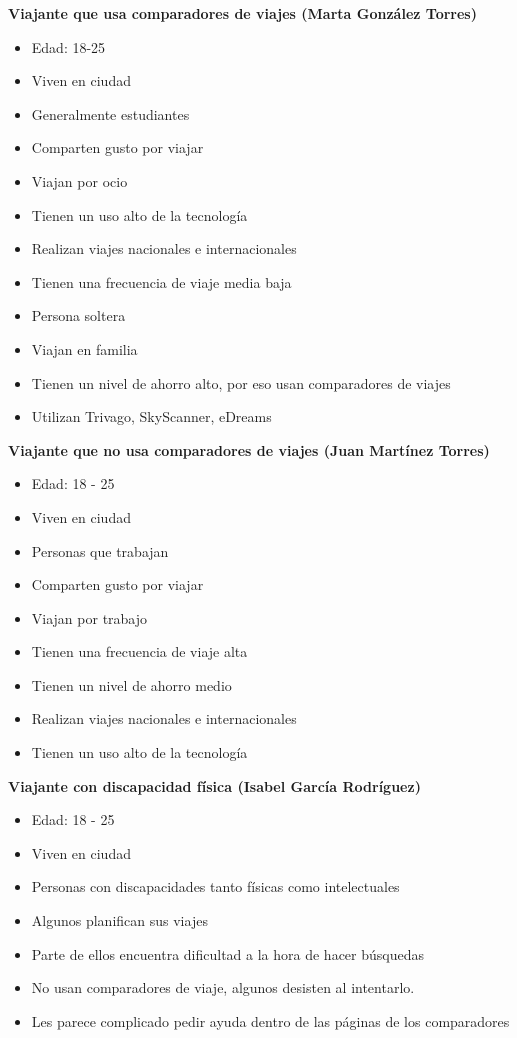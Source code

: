 \textbf{Viajante que usa comparadores de viajes (Marta González Torres)}
\begin{itemize}
    \item Edad: 18-25
    \item Viven en ciudad
    \item Generalmente estudiantes
    \item Comparten gusto por viajar
    \item Viajan por ocio
    \item Tienen un uso alto de la tecnología
    \item Realizan viajes nacionales e internacionales
    \item Tienen una frecuencia de viaje media baja
    \item Persona soltera
    \item Viajan en familia
    \item Tienen un nivel de ahorro alto, por eso usan comparadores de viajes
    \item Utilizan Trivago, SkyScanner, eDreams            
\end{itemize}

\textbf{Viajante que no usa comparadores de viajes (Juan Martínez Torres)}
\begin{itemize}
    \item Edad: 18 - 25
    \item Viven en ciudad
    \item Personas que trabajan
    \item Comparten gusto por viajar
    \item Viajan por trabajo
    \item Tienen una frecuencia de viaje alta
    \item Tienen un nivel de ahorro medio
    \item Realizan viajes nacionales e internacionales
    \item Tienen un uso alto de la tecnología                       
\end{itemize}

\textbf{Viajante con discapacidad física (Isabel García Rodríguez)}
\begin{itemize}
    \item Edad: 18 - 25
    \item Viven en ciudad
    \item Personas con discapacidades tanto físicas como intelectuales
    \item Algunos planifican sus viajes
    \item Parte de ellos encuentra dificultad a la hora de hacer búsquedas
    \item No usan comparadores de viaje, algunos desisten al intentarlo.
    \item Les parece complicado pedir ayuda dentro de las páginas de los comparadores                      
\end{itemize}

